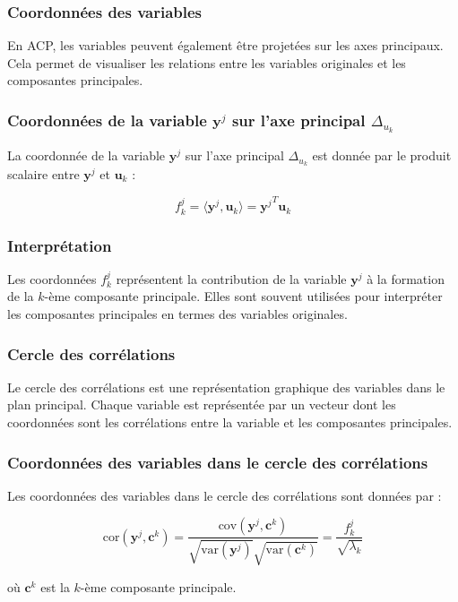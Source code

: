 \documentclass[10pt,a4paper]{article}
\begin{document}
\subsubsection*{Coordonnées des variables}
En ACP, les variables peuvent également être projetées sur les axes principaux. Cela permet de visualiser les relations entre les variables originales et les composantes principales.

\subsubsection*{Coordonnées de la variable $\mathbf{y}^j$ sur l'axe principal $\Delta_{u_k}$}
La coordonnée de la variable $\mathbf{y}^j$ sur l'axe principal $\Delta_{u_k}$ est donnée par le produit scalaire entre $\mathbf{y}^j$ et $\mathbf{u}_k$ :

\[
f_k^j = \langle \mathbf{y}^j, \mathbf{u}_k \rangle = {\mathbf{y}^j}^T \mathbf{u}_k
\]

\subsubsection*{Interprétation}
Les coordonnées $f_k^j$ représentent la contribution de la variable $\mathbf{y}^j$ à la formation de la $k$-ème composante principale. Elles sont souvent utilisées pour interpréter les composantes principales en termes des variables originales.

\subsubsection*{Cercle des corrélations}
Le cercle des corrélations est une représentation graphique des variables dans le plan principal. Chaque variable est représentée par un vecteur dont les coordonnées sont les corrélations entre la variable et les composantes principales.

\subsubsection*{Coordonnées des variables dans le cercle des corrélations}
Les coordonnées des variables dans le cercle des corrélations sont données par :

\[
\text{cor}(\mathbf{y}^j, \mathbf{c}^k) = \frac{\text{cov}(\mathbf{y}^j, \mathbf{c}^k)}{\sqrt{\text{var}(\mathbf{y}^j)} \sqrt{\text{var}(\mathbf{c}^k)}} = \frac{f_k^j}{\sqrt{\lambda_k}}
\]

où $\mathbf{c}^k$ est la $k$-ème composante principale.
\end{document}
